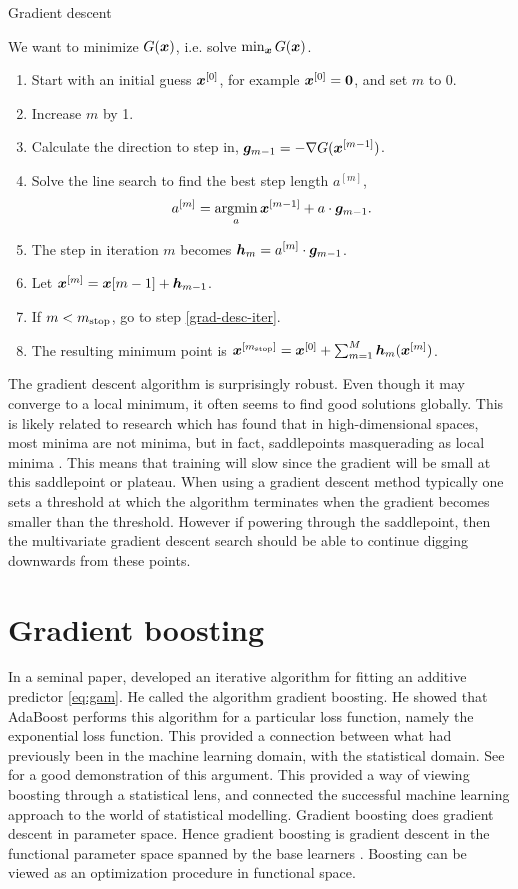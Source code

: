 \begin{algorithm}
\caption{Gradient descent}
\label{algo:grad-desc}
We want to minimize $G(\bm{x})$, i.e. solve $\min_{\bm{x}}G(\bm{x})$.
\begin{enumerate}
    \item Start with an initial guess $\bm{x}^{[0]}$, for example $\bm{x}^{[0]}=\bm{0}$, and set $m$ to 0.
    \item\label{grad-desc-iter} Increase $m$ by 1.
    \item Calculate the direction to step in, $\bm{g}_{m-1}=-\nabla G(\bm{x}^{[m-1]})$.
    \item Solve the line search to find the best step length $a^{[m]}$,
        \begin{equation*}
            a^{[m]}=\operatorname*{argmin}_{a}\bm{x}^{[m-1]}+a\cdot\bm{g}_{m-1}.
        \end{equation*}
    \item The step in iteration $m$ becomes $\bm{h}_m=a^{[m]}\cdot\bm{g}_{m-1}$.
    \item Let $\bm{x}^{[m]}=\bm{x}{[m-1]}+\bm{h}_{m-1}$.
    \item If $m<m_{\text{stop}}$, go to step \eqref{grad-desc-iter}.
    \item The resulting minimum point is $\bm{x}^{[m_{\text{stop}}]}=\bm{x}^{[0]}+\sum_{m=1}^M\bm{h}_m(\bm{x}^{[m]})$.
\end{enumerate}
\end{algorithm}
The gradient descent algorithm is surprisingly robust. Even though it may converge to a local minimum, it often seems to find good solutions globally. This is likely related to research which has found that in high-dimensional spaces, most minima are not minima, but in fact, saddlepoints masquerading as local minima \citep{saddlepoints}. This means that training will slow since the gradient will be small at this saddlepoint or plateau. When using a gradient descent method typically one sets a threshold at which the algorithm terminates when the gradient becomes smaller than the threshold. However if powering through the saddlepoint, then the multivariate gradient descent search should be able to continue digging downwards from these points.

\section{Gradient boosting}
In a seminal paper, \citet{friedman2001} developed an iterative algorithm for fitting an additive predictor \eqref{eq:gam}.
He called the algorithm gradient boosting.
He showed that AdaBoost performs this algorithm for a particular loss function, namely the exponential loss function.
This provided a connection between what had previously been in the machine learning domain, with the statistical domain. See \citet{ESL} for a good demonstration of this argument. This provided a way of viewing boosting through a statistical lens, and connected the successful machine learning approach to the world of statistical modelling. Gradient boosting does gradient descent in parameter space. Hence gradient boosting is gradient descent in the functional parameter space spanned by the base learners \citep{friedman2001}. Boosting can be viewed as an optimization procedure in functional space.

